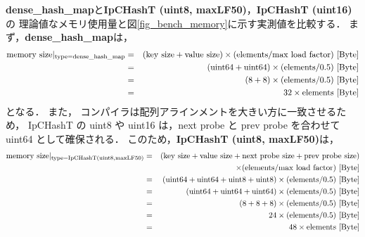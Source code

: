 {\bf dense\_hash\_map}と{\bf IpCHashT (uint8, maxLF50)}，{\bf IpCHashT (uint16)}の
理論値なメモリ使用量と図\ref{fig_bench_memory}に示す実測値を比較する．
まず，{\bf dense\_hash\_map}は，
\begin{eqnarray*}
  {\rm memory\ size|_{type=dense\_hash\_map}} &=& ({\rm key\ size} + {\rm value\ size}) \times ({\rm elements} / {\rm max\ load\ factor}) {\rm\ [Byte]}\\
  &=& ({\rm uint64} + {\rm uint64}) \times ({\rm elements} / 0.5) {\rm\ [Byte]}\\
  &=& (8 + 8) \times ({\rm elements} / 0.5) {\rm\ [Byte]}\\
  &=& 32 \times {\rm elements} {\rm\ [Byte]}
\end{eqnarray*}
となる．
また，
コンパイラは配列アラインメントを大きい方に一致させるため，
IpCHashT の uint8 や uint16 は，next probe と prev probe を合わせて uint64 として確保される．
このため，{\bf IpCHashT (uint8, maxLF50)}は，
\begin{eqnarray*}
  {\rm memory\ size|_{type=IpCHashT (uint8, maxLF50)}} &=& ({\rm key\ size} + {\rm value\ size} + {\rm next\ probe\ size} + {\rm prev\ probe\ size})\\
                                              & & \times ({\rm elements} / {\rm max\ load\ factor}) {\rm\ [Byte]}\\
  &=& ({\rm uint64} + {\rm uint64} + {\rm uint8} + {\rm uint8}) \times ({\rm elements} / 0.5) {\rm\ [Byte]}\\
  &=& ({\rm uint64} + {\rm uint64} + {\rm uint64}) \times ({\rm elements} / 0.5) {\rm\ [Byte]}\\
  &=& (8 + 8 + 8) \times ({\rm elements} / 0.5) {\rm\ [Byte]}\\
  &=& 24 \times ({\rm elements} / 0.5) {\rm\ [Byte]}\\
  &=& 48 \times {\rm elements} {\rm\ [Byte]}
\end{eqnarray*}
